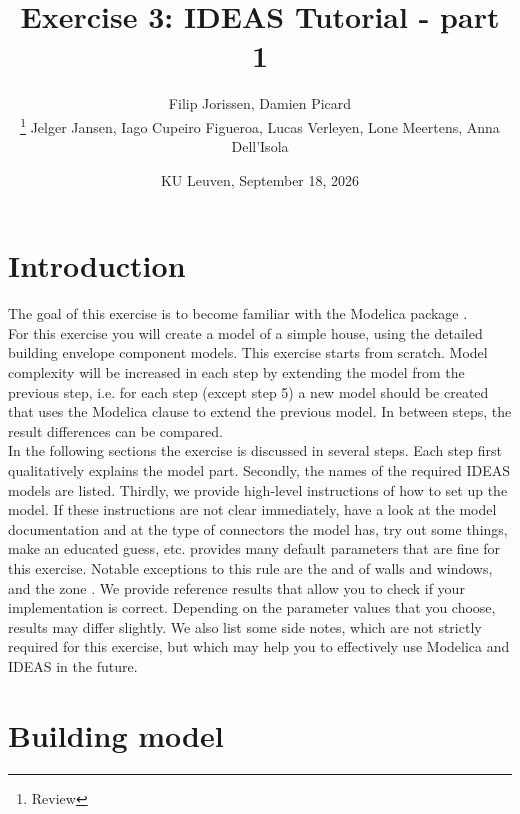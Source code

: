 \documentclass[10pt,a4paper]{article}
\begin{document}
\title{Exercise 3: IDEAS Tutorial - part 1}
\author{Filip Jorissen, Damien Picard\\ \thanks{Review}  Jelger Jansen, Iago Cupeiro Figueroa, Lucas Verleyen, Lone Meertens, Anna Dell'Isola}
\date{KU Leuven, September 18, 2026}
\maketitle

\doclicenseThis

\section*{Introduction}
The goal of this exercise is to become familiar with the 
Modelica package . \\

For this exercise you will create a model of a simple house,
using the detailed building envelope component models.
This exercise starts from scratch. 
Model complexity will be increased in each step by 
extending the model from the previous step, i.e. for each step (except step 5) a new model should be created that uses
the Modelica  clause to extend the previous model.
In between steps, the result differences can be compared.\\


In the following sections the exercise is discussed 
in several steps. 
Each step first qualitatively explains the model part.
Secondly, the names of the required IDEAS models 
are listed.
Thirdly, we provide high-level instructions of how to
set up the model.
If these instructions are not clear immediately, 
have a look at the model documentation and at the type of
connectors the model has, 
try out some things, 
make an educated guess, etc.
 provides many default parameters that are fine for
this exercise. Notable exceptions to this rule are
the   and   of walls and windows, and the zone .
We provide reference results that allow you to check
if your implementation is correct. 
Depending on the parameter values that you choose, results
may differ slightly.
We also list some side notes, which are not strictly required for this
exercise, but which may help you to effectively use Modelica
and IDEAS in the future.

\newpage

\section{Building  model}
\end{document}
